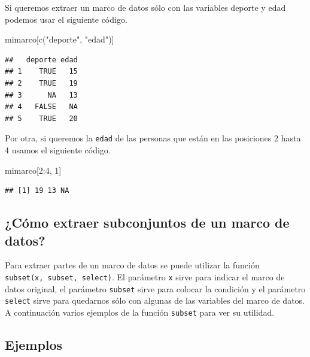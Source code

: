 \documentclass[
]{book}
\makeatletter
\newenvironment{Shaded}{\begin{snugshade}}{\end{snugshade}}
\newcommand{\DecValTok}[1]{\textcolor[rgb]{0.00,0.00,0.81}{#1}}
\newcommand{\FunctionTok}[1]{\textcolor[rgb]{0.00,0.00,0.00}{#1}}
\newcommand{\NormalTok}[1]{#1}
\newcommand{\SpecialCharTok}[1]{\textcolor[rgb]{0.00,0.00,0.00}{#1}}
\newcommand{\StringTok}[1]{\textcolor[rgb]{0.31,0.60,0.02}{#1}}
\newenvironment{kframe}{%
\medskip{}
\setlength{\fboxsep}{.8em}
 \def\at@end@of@kframe{}%
 \ifinner\ifhmode%
  \def\at@end@of@kframe{\end{minipage}}%
  \begin{minipage}{\columnwidth}%
 \fi\fi%
 \def\FrameCommand##1{\hskip\@totalleftmargin \hskip-\fboxsep
 \colorbox{shadecolor}{##1}\hskip-\fboxsep
     \hskip-\linewidth \hskip-\@totalleftmargin \hskip\columnwidth}%
 \MakeFramed {\advance\hsize-\width
   \@totalleftmargin\z@ \linewidth\hsize
   \@setminipage}}%
 {\par\unskip\endMakeFramed%
 \at@end@of@kframe}
\renewenvironment{Shaded}{\begin{kframe}}{\end{kframe}}
\makeatother
\begin{document}
Si queremos extraer un marco de datos sólo con las variables deporte y edad podemos usar el siguiente código.

\begin{Shaded}
\begin{Highlighting}[]
\NormalTok{mimarco[}\FunctionTok{c}\NormalTok{(}\StringTok{"deporte"}\NormalTok{, }\StringTok{"edad"}\NormalTok{)]}
\end{Highlighting}
\end{Shaded}

\begin{verbatim}
##   deporte edad
## 1    TRUE   15
## 2    TRUE   19
## 3      NA   13
## 4   FALSE   NA
## 5    TRUE   20
\end{verbatim}

Por otra, si queremos la \texttt{edad} de las personas que están en las posiciones 2 hasta 4 usamos el siguiente código.

\begin{Shaded}
\begin{Highlighting}[]
\NormalTok{mimarco[}\DecValTok{2}\SpecialCharTok{:}\DecValTok{4}\NormalTok{, }\DecValTok{1}\NormalTok{]}
\end{Highlighting}
\end{Shaded}

\begin{verbatim}
## [1] 19 13 NA
\end{verbatim}

\hypertarget{cuxf3mo-extraer-subconjuntos-de-un-marco-de-datos}{%
\subsection{\texorpdfstring{¿Cómo extraer subconjuntos de un marco de datos? }{¿Cómo extraer subconjuntos de un marco de datos? }}\label{cuxf3mo-extraer-subconjuntos-de-un-marco-de-datos}}

Para extraer partes de un marco de datos se puede utilizar la función \texttt{subset(x,\ subset,\ select)}. El parámetro \texttt{x} sirve para indicar el marco de datos original, el parámetro \texttt{subset} sirve para colocar la condición y el parámetro \texttt{select} sirve para quedarnos sólo con algunas de las variables del marco de datos. A continuación varios ejemplos de la función \texttt{subset} para ver su utilidad.

\hypertarget{ejemplos}{%
\subsection*{Ejemplos}\label{ejemplos}}
\end{document}
